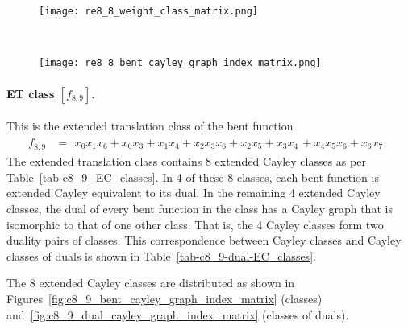 \documentclass[12pt,a4paper]{article}
\begin{document}
\begin{figure}[!bhpt] %
\centering
\begin{minipage}{.48\textwidth}
  \centering
  \texttt{[image: re8\_8\_weight\_class\_matrix.png]}
  \label{fig:c8_8_weight_class_matrix}
\end{minipage}%
~~~~
\begin{minipage}{.48\textwidth}
  \centering
  \texttt{[image: re8\_8\_bent\_cayley\_graph\_index\_matrix.png]}
  \label{fig:c8_8_bent_cayley_graph_index_matrix}
\end{minipage}
\end{figure}

\paragraph*{ET class $[f_{8,9}]$.}
%
%
This is the extended translation class of the bent function
\small{}
\begin{align*}
f_{ 8 , 9 } &=
\begin{array}{l}
x_{0} x_{1} x_{6} + x_{0} x_{3} + x_{1} x_{4} + x_{2} x_{3} x_{6} + x_{2} x_{5} + x_{3} x_{4}\, +
x_{4} x_{5} x_{6} + x_{6} x_{7}.
\end{array}
\end{align*}
\normalsize{}
The extended translation class contains 8 extended Cayley classes as per Table~\ref{tab-c8_9_EC_classes}.
In 4 of these 8 classes, each bent function is extended Cayley equivalent to its dual.
In the remaining 4 extended Cayley classes, the dual of every bent function in the class has a Cayley graph
that is isomorphic to that of one other class. That is, the 4 Cayley classes form two duality pairs of classes.
This correspondence between Cayley classes and Cayley classes of duals is shown in Table~\ref{tab-c8_9-dual-EC_classes}.

The 8 extended Cayley classes are distributed
as shown in Figures~\ref{fig:c8_9_bent_cayley_graph_index_matrix} (classes) and~\ref{fig:c8_9_dual_cayley_graph_index_matrix}
(classes of duals).
\end{document}
